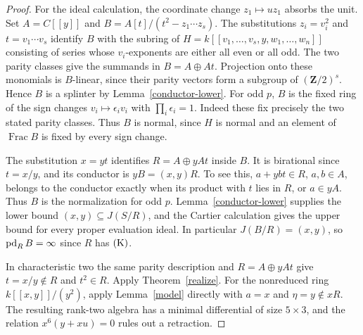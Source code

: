 \begin{proof}
For the ideal calculation, the coordinate change $z_1\mapsto u z_1$ absorbs the unit. Set $A=C[[y]]$ and $B=A[t]/(t^2-z_1\cdots z_s)$. The substitutions $z_i=v_i^2$ and $t=v_1\cdots v_s$ identify $B$ with the subring of
$H=k[[v_1,\ldots,v_s,y,w_1,\ldots,w_n]]$ consisting of series whose $v_i$-exponents are either all even or all odd. The two parity classes give the summands in $B=A\oplus At$. Projection onto these monomials is $B$-linear, since their parity vectors form a subgroup of $(\mathbf Z/2)^s$. Hence $B$ is a splinter by Lemma~\ref{conductor-lower}. For odd $p$, $B$ is the fixed ring of the sign changes $v_i\mapsto\epsilon_i v_i$ with $\prod_i\epsilon_i=1$. Indeed these fix precisely the two stated parity classes. Thus $B$ is normal, since $H$ is normal and an element of $\operatorname{Frac}B$ is fixed by every sign change.

The substitution $x=yt$ identifies $R=A\oplus yAt$ inside $B$. It is birational since $t=x/y$, and its conductor is $yB=(x,y)R$. To see this, $a+ybt\in R$, $a,b\in A$, belongs to the conductor exactly when its product with $t$ lies in $R$, or $a\in yA$. Thus $B$ is the normalization for odd $p$. Lemma~\ref{conductor-lower} supplies the lower bound $(x,y)\subseteq J(S/R)$, and the Cartier calculation gives the upper bound for every proper evaluation ideal. In particular $J(B/R)=(x,y)$, so $\operatorname{pd}_R B=\infty$ since $R$ has $\mathrm{(K)}$.

In characteristic two the same parity description and $R=A\oplus yAt$ give $t=x/y\notin R$ and $t^2\in R$. Apply Theorem~\ref{realize}. For the nonreduced ring $k[[x,y]]/(y^2)$, apply
Lemma~\ref{model} directly with $a=x$ and $\eta=y\notin xR$.
The resulting rank-two algebra has a minimal differential of size
$5\times3$, and the relation $x^6(y+xu)=0$ rules out a retraction.
\end{proof}

